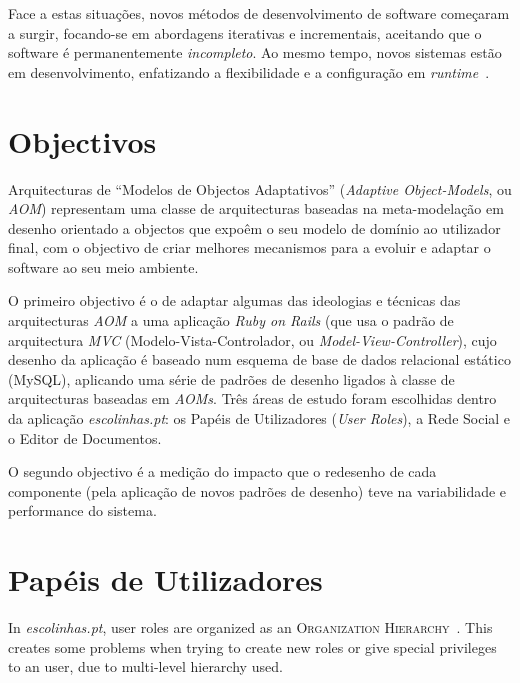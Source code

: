 \documentclass[9pt,a4paper]{extarticle}
\begin{document}
\begin{multicols}{2}

Face a estas situações, novos métodos de desenvolvimento de software começaram a surgir, focando-se em abordagens iterativas e incrementais, aceitando que o software é permanentemente \emph{incompleto}. Ao mesmo tempo, novos sistemas estão em desenvolvimento, enfatizando a flexibilidade e a configuração em \emph{runtime}~\cite{YJ02}.

\section{Objectivos}\label{sec:objectives}

Arquitecturas de ``Modelos de Objectos Adaptativos'' (\emph{Adaptive Object-Models}, ou \emph{AOM}) representam uma classe de arquitecturas baseadas na meta-modelação em desenho orientado a objectos que expoêm o seu modelo de domínio ao utilizador final, com o objectivo de criar melhores mecanismos para a evoluir e adaptar o software ao seu meio ambiente.

O primeiro objectivo é o de adaptar algumas das ideologias e técnicas das arquitecturas \emph{AOM} a uma aplicação \emph{Ruby on Rails} (que usa o padrão de arquitectura \emph{MVC} (Modelo-Vista-Controlador, ou \emph{Model-View-Controller}), cujo desenho da aplicação é baseado num esquema de base de dados relacional estático (MySQL), aplicando uma série de padrões de desenho ligados à classe de arquitecturas baseadas em \emph{AOMs}. Três áreas de estudo foram escolhidas dentro da aplicação \emph{escolinhas.pt}: os Papéis de Utilizadores (\emph{User Roles}), a Rede Social e o Editor de Documentos.

O segundo objectivo é a medição do impacto que o redesenho de cada componente (pela aplicação de novos padrões de desenho) teve na variabilidade e performance do sistema.

\section{Papéis de Utilizadores}\label{sec:user_roles}

In \emph{escolinhas.pt}, user roles are organized as an \textsc{Organization Hierarchy}~\cite{fowler_accountability}. This creates some problems when trying to create new roles or give special privileges to an user, due to multi-level hierarchy used.


\end{multicols}
\end{document}
